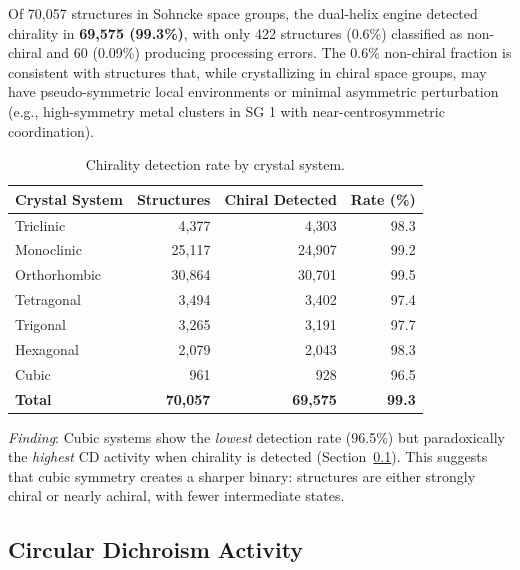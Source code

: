 \documentclass[11pt,a4paper]{article}
\begin{document}
Of 70,057 structures in Sohncke space groups, the dual-helix engine detected chirality in \textbf{69,575 (99.3\%)}, with only 422 structures (0.6\%) classified as non-chiral and 60 (0.09\%) producing processing errors. The 0.6\% non-chiral fraction is consistent with structures that, while crystallizing in chiral space groups, may have pseudo-symmetric local environments or minimal asymmetric perturbation (e.g., high-symmetry metal clusters in SG 1 with near-centrosymmetric coordination).

\begin{table}[H]
\centering
\caption{Chirality detection rate by crystal system.}
\label{tab:detection}
\begin{tabular}{lrrr}
\toprule
Crystal System & Structures & Chiral Detected & Rate (\%) \\
\midrule
Triclinic & 4,377 & 4,303 & 98.3 \\
Monoclinic & 25,117 & 24,907 & 99.2 \\
Orthorhombic & 30,864 & 30,701 & 99.5 \\
Tetragonal & 3,494 & 3,402 & 97.4 \\
Trigonal & 3,265 & 3,191 & 97.7 \\
Hexagonal & 2,079 & 2,043 & 98.3 \\
Cubic & 961 & 928 & 96.5 \\
\midrule
\textbf{Total} & \textbf{70,057} & \textbf{69,575} & \textbf{99.3} \\
\bottomrule
\end{tabular}
\end{table}

\noindent\textit{Finding}: Cubic systems show the \emph{lowest} detection rate (96.5\%) but paradoxically the \emph{highest} CD activity when chirality is detected (Section~\ref{sec:cd_system}). This suggests that cubic symmetry creates a sharper binary: structures are either strongly chiral or nearly achiral, with fewer intermediate states.

\subsection{Circular Dichroism Activity}
\label{sec:cd_system}
\end{document}
